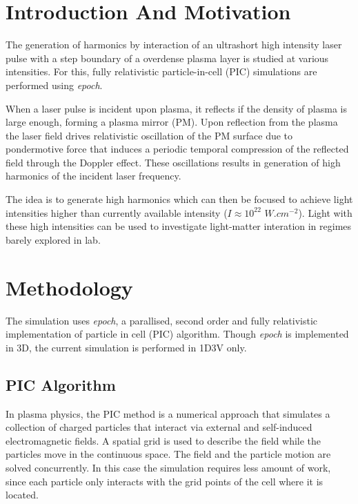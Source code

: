 \documentclass[12pt]{article}
\newenvironment{changemargin}[2]{%
\begin{list}{}{%
\setlength{\topsep}{0pt}%
\setlength{\leftmargin}{#1}%
\setlength{\rightmargin}{#2}%
\setlength{\listparindent}{\parindent}%
\setlength{\itemindent}{\parindent}%
\setlength{\parsep}{\parskip}%
}%
\item[]}{\end{list}}
\begin{document}
\newpage
\begin{changemargin}{-3cm}{-3cm}
    \section{Introduction And Motivation}
    The generation of harmonics by interaction of an ultrashort high intensity laser pulse with a step boundary of a overdense plasma layer is studied at various intensities. For this, fully relativistic particle-in-cell (PIC) simulations are performed using \textit{epoch}.

    When a laser pulse is incident upon plasma, it reflects if the density of plasma is large enough, forming a plasma mirror (PM). Upon reflection from the plasma the laser field drives relativistic oscillation of the PM surface due to pondermotive force that induces a periodic temporal compression of the reflected field through the Doppler effect. These oscillations results in generation of high harmonics of the incident laser frequency.\cite{lichters}

    The idea is to generate high harmonics which can then be focused to achieve light intensities higher than currently available intensity ($I \approx 10^{22}$ $W.cm^{-2}$). Light with these high intensities can be used to investigate light-matter interation in regimes barely explored in lab.\cite{henri}


    \section{Methodology}
    The simulation uses \textit{epoch}, a parallised, second order and fully relativistic implementation of particle in cell (PIC) algorithm.\cite{epoch} Though \textit{epoch} is implemented in 3D, the current simulation is performed in 1D3V only.
    \subsection{PIC Algorithm}
    In plasma physics, the PIC method is a numerical approach that simulates a collection
    of charged particles that interact via external and self-induced electromagnetic fields. A
    spatial grid is used to describe the field while the particles move in the continuous space. The field and the particle motion are solved concurrently. In this case the simulation
    requires less amount of work, since each particle only interacts with the grid points of
    the cell where it is located.\cite{suciu}


\end{changemargin}
\end{document}
